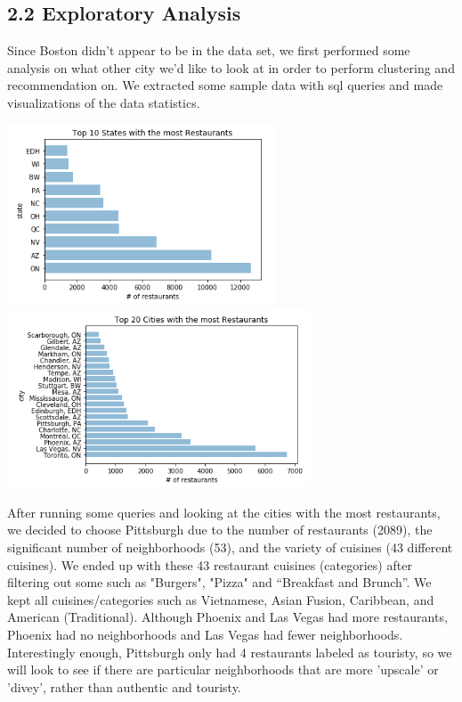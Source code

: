 \documentclass{neu_handout}
\begin{document}
\subsection*{2.2 Exploratory Analysis}

   Since Boston didn't appear to be in the data set, we first performed some analysis on what other city we'd like to look at in order to perform clustering and recommendation on. We extracted some sample data with sql queries and made visualizations of the data statistics.
   
\begin{center}
\includegraphics[width=80mm,scale=0.5]{states}
\includegraphics[width=90mm,scale=0.5]{cities}
\end{center}
   
After running some queries and looking at the cities with the most restaurants, we decided to choose Pittsburgh due to the number of restaurants (2089), the significant number of neighborhoods (53), and the variety of cuisines (43 different cuisines). We ended up with these 43 restaurant
cuisines (categories) after filtering out some such as "Burgers", "Pizza" and “Breakfast and Brunch”. We kept all cuisines/categories such as Vietnamese, Asian Fusion, Caribbean, and American (Traditional). Although Phoenix and Las Vegas had more restaurants, Phoenix had no neighborhoods and Las Vegas had fewer neighborhoods. Interestingly enough, Pittsburgh only had 4 restaurants labeled as touristy, so we will look to see if there are particular neighborhoods that are more 'upscale' or 'divey', rather than authentic and touristy.\\
\end{document}
